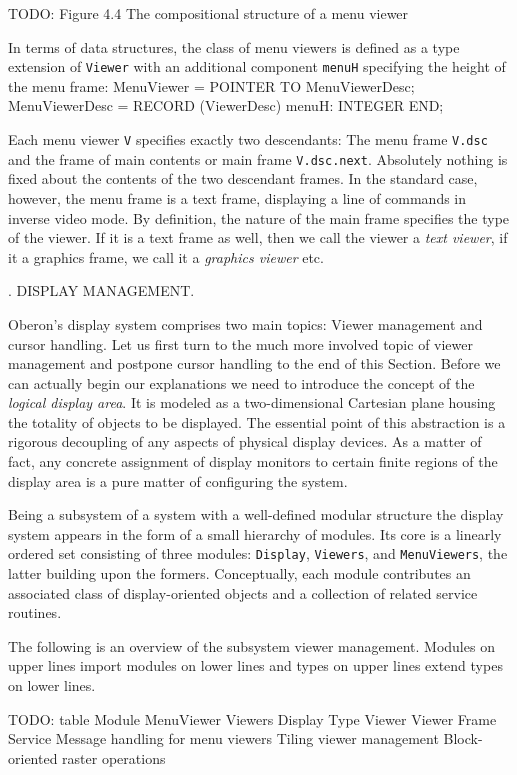 TODO: Figure 4.4 The compositional structure of a menu viewer

In terms of data structures, the class of menu viewers is defined as a
type extension of {\tt Viewer\/} with an additional component {\tt menuH\/}
specifying the height of the menu frame:
\begintt
MenuViewer = POINTER TO MenuViewerDesc;
MenuViewerDesc = RECORD (ViewerDesc)
  menuH: INTEGER
END;
\endtt

\noindent Each menu viewer {\tt V\/} specifies exactly two
descendants: The menu frame {\tt V.dsc\/} and the frame of main
contents or main frame {\tt V.dsc.next\/}. Absolutely nothing is fixed
about the contents of the two descendant frames. In the standard case,
however, the menu frame is a text frame, displaying a line of commands
in inverse video mode. By definition, the nature of the main frame
specifies the type of the viewer. If it is a text frame as well, then
we call the viewer a {\it text viewer\/}, if it a graphics frame, we call it a
{\it graphics viewer\/} etc.

. DISPLAY MANAGEMENT.

Oberon's display system comprises two main topics: Viewer management
and cursor handling. Let us first turn to the much more involved topic
of viewer management and postpone cursor handling to the end of this
Section. Before we can actually begin our explanations we need to
introduce the concept of the {\it logical display area\/}. It is modeled as a
two-dimensional Cartesian plane housing the totality of objects to be
displayed. The essential point of this abstraction is a rigorous
decoupling of any aspects of physical display devices. As a matter of
fact, any concrete assignment of display monitors to certain finite
regions of the display area is a pure matter of configuring the
system.

Being a subsystem of a system with a well-defined modular structure
the display system appears in the form of a small hierarchy of
modules. Its core is a linearly ordered set consisting of three
modules: {\tt Display\/}, {\tt Viewers\/}, and {\tt MenuViewers\/}, the latter building upon
the formers. Conceptually, each module contributes an associated class
of display-oriented objects and a collection of related service
routines.

The following is an overview of the subsystem viewer
management. Modules on upper lines import modules on lower lines and
types on upper lines extend types on lower lines.

TODO: table
Module
MenuViewer Viewers Display
Type
Viewer Viewer Frame
Service
Message handling for menu viewers Tiling viewer management Block-oriented raster operations

